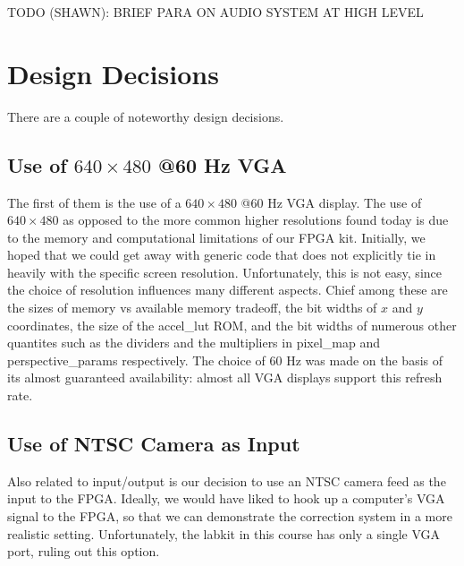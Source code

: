 \documentclass{article}
\begin{document}
TODO (SHAWN): BRIEF PARA ON AUDIO SYSTEM AT HIGH LEVEL

\section{Design Decisions}

There are a couple of noteworthy design decisions.

\subsection{Use of $640 \times 480$ @60 Hz VGA}
The first of them is the use of a $640 \times 480$ @60 Hz VGA display.
The use of $640 \times 480$  as opposed to the more common higher resolutions found today is due to the memory and computational limitations of our FPGA kit.
Initially, we hoped that we could get away with generic code that does not explicitly tie in heavily with the specific screen resolution.
Unfortunately, this is not easy, since the choice of resolution influences many different aspects.
Chief among these are the sizes of memory vs available memory tradeoff, the bit widths of $x$ and $y$ coordinates, the size of the accel\_lut ROM,
and the bit widths of numerous other quantites such as the dividers and the multipliers in pixel\_map and perspective\_params respectively.
The choice of 60 Hz was made on the basis of its almost guaranteed availability: almost all VGA displays support this refresh rate.

\subsection{Use of NTSC Camera as Input}
Also related to input/output is our decision to use an NTSC camera feed as the input to the FPGA.
Ideally, we would have liked to hook up a computer's VGA signal to the FPGA, so that we can demonstrate the correction system in a more realistic setting.
Unfortunately, the labkit in this course has only a single VGA port, ruling out this option.
\end{document}
